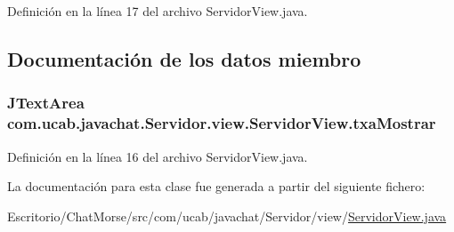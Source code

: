 Definición en la línea 17 del archivo Servidor\-View.\-java.



\subsection{Documentación de los datos miembro}
\hypertarget{classcom_1_1ucab_1_1javachat_1_1_servidor_1_1view_1_1_servidor_view_af10318edbbf3ea754e088eeea63626c0}{
\subsubsection[{txa\-Mostrar}]{\setlength{\rightskip}{0pt plus 5cm}J\-Text\-Area com.\-ucab.\-javachat.\-Servidor.\-view.\-Servidor\-View.\-txa\-Mostrar}}\label{classcom_1_1ucab_1_1javachat_1_1_servidor_1_1view_1_1_servidor_view_af10318edbbf3ea754e088eeea63626c0}


Definición en la línea 16 del archivo Servidor\-View.\-java.



La documentación para esta clase fue generada a partir del siguiente fichero\-:\begin{DoxyCompactItemize}
\item 
Escritorio/\-Chat\-Morse/src/com/ucab/javachat/\-Servidor/view/\hyperlink{_servidor_view_8java}{Servidor\-View.\-java}\end{DoxyCompactItemize}
